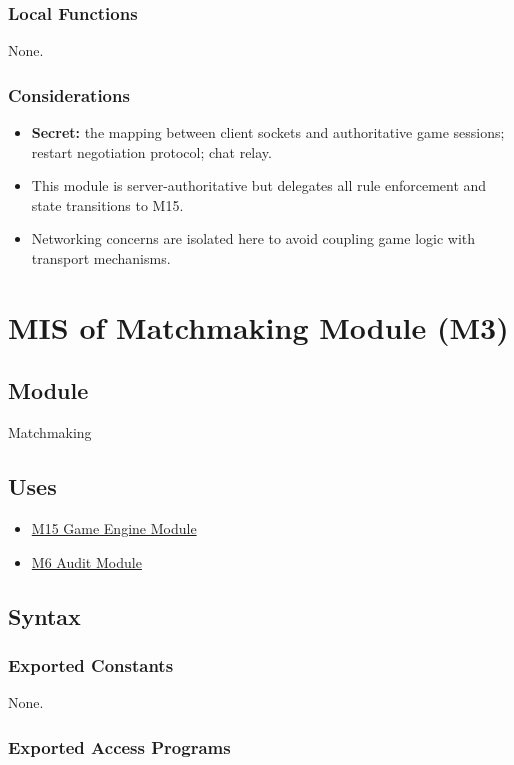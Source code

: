 \documentclass[12pt, titlepage]{article}
\begin{document}
\subsubsection{Local Functions}
None.

\subsubsection{Considerations}
\begin{itemize}
    \item \textbf{Secret:} the mapping between client sockets and authoritative game sessions; restart negotiation protocol; chat relay.
    \item This module is server-authoritative but delegates all rule enforcement and state transitions to M15.
    \item Networking concerns are isolated here to avoid coupling game logic with transport mechanisms.
\end{itemize}


\newpage
\section{MIS of Matchmaking Module (M3)}\label{sec:matchmaking-module}

\subsection{Module}
Matchmaking

\subsection{Uses}
\begin{itemize}
    \item \hyperref[sec:game-engine-module]{M15 Game Engine Module}
    \item \hyperref[sec:audit-module]{M6 Audit Module}
\end{itemize}

\subsection{Syntax}

\subsubsection{Exported Constants}
None.

\subsubsection{Exported Access Programs}
\end{document}
